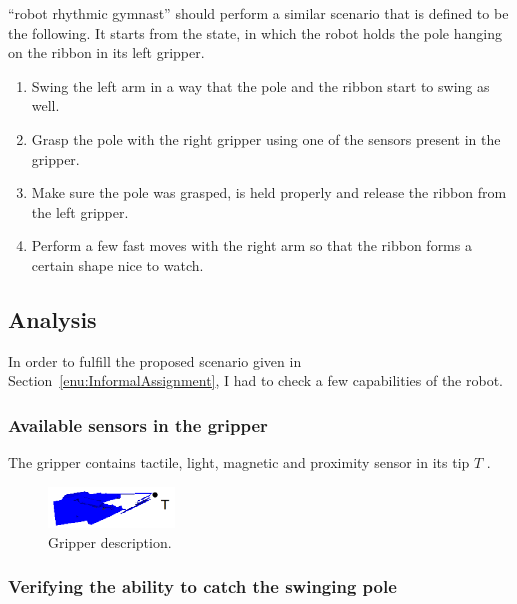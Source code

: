         

       \CloPeMa\/ ``robot rhythmic gymnast'' should perform a similar scenario that is defined to be the following. It starts from the state, in which the robot holds the pole hanging on the ribbon in its left gripper.
%
       \begin{enumerate}\itemsep0pt
       \label{enu:InformalAssignment}
            \item Swing the left arm in a way that the pole and the ribbon start to swing as well.
            \item Grasp the pole with the right gripper using one of the sensors present in the gripper.
            \item Make sure the pole was grasped, is held properly and release the ribbon from the left gripper.
            \item Perform a few fast moves with the right arm so that the ribbon forms a certain shape nice to watch.
       \end{enumerate}


    \subsection{Analysis}
        In order to fulfill the proposed scenario given in Section~\ref{enu:InformalAssignment}, I had to check a few capabilities of the \CloPeMa\/ robot.

        \subsubsection{Available sensors in the gripper}
            The gripper contains tactile, light, magnetic and proximity sensor in its tip $T$ \cite{SalanskyGripper}.

            \begin{figure}[h]
            \includegraphics[width=0.3\textwidth]{GripperDesc.png}
            \centering
            \caption{Gripper description.}
            \label{fig:GripperDesc}
            \end{figure}

        \subsubsection{Verifying the ability to catch the swinging pole}

